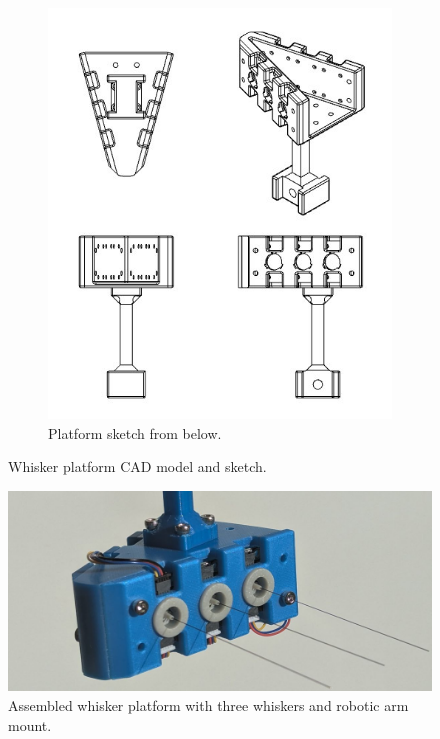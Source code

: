 \begin{figure}[ht]
\begin{subfigure}[b]{0.45\textwidth}
        \includegraphics[height=0.3\textheight]{figures/platform-sketch}
        \caption{Platform sketch from below.}
    \end{subfigure}
    \caption{Whisker platform CAD model and sketch.}
    \label{fig:platform}
\end{figure}

\begin{figure}[htb]
    \centering
    \includegraphics[width=\textwidth]{figures/platform}
    \caption{Assembled whisker platform with three whiskers and robotic arm mount.}
    \label{fig:whisker_platform}
\end{figure}


